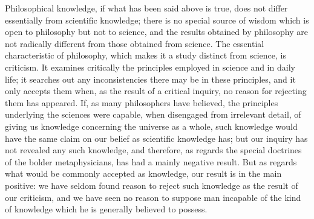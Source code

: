 \documentclass[oneside,letterpaper,12pt]{book}
\begin{document}
Philosophical knowledge, if what has been said above is true, does not
differ essentially from scientific knowledge; there is no special source
of wisdom which is open to philosophy but not to science, and the
results obtained by philosophy are not radically different from those
obtained from science. The essential characteristic of philosophy, which
makes it a study distinct from science, is criticism. \label{criticism} It examines
critically the principles employed in science and in daily life; it
searches out any inconsistencies there may be in these principles, and
it only accepts them when, as the result of a critical inquiry, no
reason for rejecting them has appeared. If, as many philosophers have
believed, the principles underlying the sciences were capable, when
disengaged from irrelevant detail, of giving us knowledge concerning the
universe as a whole, such knowledge would have the same claim on our
belief as scientific knowledge has; but our inquiry has not revealed any
such knowledge, and therefore, as regards the special doctrines of the
bolder metaphysicians, has had a mainly negative result. But as regards
what would be commonly accepted as knowledge, our result is in the main
positive: we have seldom found reason to reject such knowledge as the
result of our criticism, and we have seen no reason to suppose man
incapable of the kind of knowledge which he is generally believed to
possess.
\end{document}
